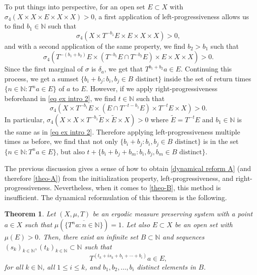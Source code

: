 \documentclass[letter, 11pt]{article}
\newtheorem{theo}{Theorem}[section]
\theoremstyle{definition}
\theoremstyle{plain}
\newcommand{\N}{\mathbb{N}}
\newcommand{\1}{\mathbbm{1}}
\begin{document}
To put things into perspective, for an open set $E\subset X$ with $\sigma_4(X\times X\times E\times X \times X) >0$,
a first application of left-progressiveness allows us to find $b_1\in \N$ such that 
\begin{equation} \label{eq ex intro 2}
    \sigma_4(X\times T^{-b_1} E \times E \times X \times X)>0,
\end{equation}
and with a second application of the same property, we find $b_2>b_1$ such that $$\sigma_4(T^{-(b_1+b_2)} E\times \left(T^{-b_1} E\cap T^{-b_2} E \right) \times E \times X \times X)>0.$$ 
Since the first marginal of $\sigma$ is $\delta_a$, we get that $T^{b_1+b_2}a\in  E$. Continuing this process, we get a sumset $\{ b_i+b_j : b_i,b_j\in B\text{ distinct} \}$ inside the set of return times $\{n\in \N: T^na\in E\}$ of $a$ to $E$. However, if we apply right-progressiveness beforehand in \eqref{eq ex intro 2}, we find $t\in \N$ such that
$$\sigma_4(X\times T^{-b_1}E\times (E \cap T^{-t - b_1}E)\times T^{-t}E \times X)>0. $$
In particular, $\sigma_4(X\times X\times T^{-b_1} \tilde E \times \tilde E \times X)>0$ where $\tilde{E}=T^{-t}E$ and $b_1 \in \N$ is the same as in \eqref{eq ex intro 2}. Therefore applying left-progressiveness multiple times as before, we find that not only $\{ b_i+b_j : b_i,b_j\in B\text{ distinct} \}$ is in the set $\{n\in \N: T^na\in E\}$, but also  $t+\{ b_i+b_j+b_m : b_i,b_j,b_m\in B\text{ distinct} \}$. 

The previous discussion gives a sense of how to obtain \cref{dynamical reform A} (and therefore \cref{theo-A}) from the initialization property, left-progressiveness, and right-progressiveness. Nevertheless, when it comes to \cref{theo-B}, this method is insufficient. The dynamical reformulation of this theorem is the following. 

\begin{theo}\label{dynamical reform B}
Let $(X,\mu,T)$ be an ergodic measure preserving system with a point $a\in X$ such that $\mu\left(\overline{\{T^na: n\in \N\}}\right)=1$. Let also $E\subset X$ be an open set with $\mu(E)>0$. Then, there exist an infinite set $B \subset \N$ and sequences $ (s_k)_{k\in \N}, (t_k)_{k\in \N}\subset \N$ such that 
\begin{equation} \label{eq rec for double shift equation}
    T^{\left(t_k+i s_k + b_{1}+\cdots + b_{i} \right)}a \in E,
\end{equation}
for all $k\in \N$, all $1\leq i \leq k$, and $b_1, b_2, \ldots, b_i $ distinct elements in $B$.
\end{theo}
\end{document}

